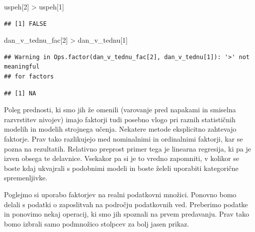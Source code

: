 \documentclass[
]{book}
\newenvironment{Shaded}{\begin{snugshade}}{\end{snugshade}}
\newcommand{\DecValTok}[1]{\textcolor[rgb]{0.00,0.00,0.81}{#1}}
\newcommand{\NormalTok}[1]{#1}
\newcommand{\SpecialCharTok}[1]{\textcolor[rgb]{0.00,0.00,0.00}{#1}}
\begin{document}
\begin{Shaded}
\begin{Highlighting}[]
\NormalTok{uspeh[}\DecValTok{2}\NormalTok{] }\SpecialCharTok{\textgreater{}}\NormalTok{ uspeh[}\DecValTok{1}\NormalTok{]}
\end{Highlighting}
\end{Shaded}

\begin{verbatim}
## [1] FALSE
\end{verbatim}

\begin{Shaded}
\begin{Highlighting}[]
\NormalTok{dan\_v\_tednu\_fac[}\DecValTok{2}\NormalTok{] }\SpecialCharTok{\textgreater{}}\NormalTok{ dan\_v\_tednu[}\DecValTok{1}\NormalTok{]}
\end{Highlighting}
\end{Shaded}

\begin{verbatim}
## Warning in Ops.factor(dan_v_tednu_fac[2], dan_v_tednu[1]): '>' not meaningful
## for factors
\end{verbatim}

\begin{verbatim}
## [1] NA
\end{verbatim}

Poleg prednosti, ki smo jih že omenili (varovanje pred napakami in smiselna razvrstitev nivojev) imajo faktorji tudi posebno vlogo pri raznih statističnih modelih in modelih strojnega učenja. Nekatere metode eksplicitno zahtevajo faktorje. Prav tako razlikujejo med nominalnimi in ordinalnimi faktorji, kar se pozna na rezultatih. Relativno preprost primer tega je linearna regresija, ki pa je izven obsega te delavnice. Vsekakor pa si je to vredno zapomniti, v kolikor se boste kdaj ukvajrali s podobnimi modeli in boste želeli uporabiti kategorične spremenljivke.

Poglejmo si uporabo faktorjev na realni podatkovni množici. Ponovno bomo delali s podatki o zaposlitvah na področju podatkovnih ved. Preberimo podatke in ponovimo nekaj operacij, ki smo jih spoznali na prvem predavanju. Prav tako bomo izbrali samo podmnožico stolpcev za bolj jasen prikaz.
\end{document}
